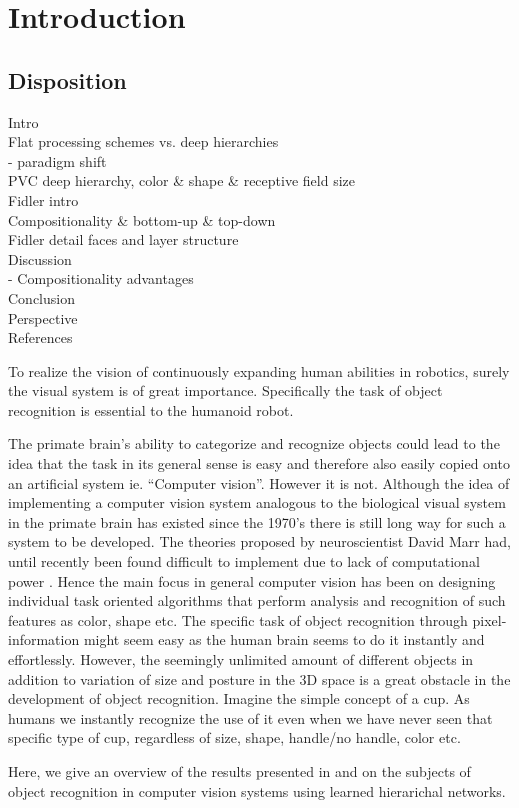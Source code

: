 \section{Introduction}
\label{sec:introduction}

\subsection{Disposition}
Intro \\
Flat processing schemes vs. deep hierarchies\\
-     paradigm shift \\
PVC deep hierarchy, color \& shape \& receptive field size\\
Fidler intro\\
Compositionality \& bottom-up \& top-down\\
Fidler detail faces and layer structure \\
Discussion \\
-    Compositionality advantages \\
Conclusion \\
Perspective \\
References \\


To realize the vision of continuously expanding human abilities in robotics,
surely the visual system is of great importance.
Specifically the task of object recognition is essential to the humanoid robot.

The primate brain's ability to categorize and recognize objects could lead to
the idea that the task in its general sense is easy and therefore also easily
copied onto an artificial system ie. “Computer vision”. However it is not.
Although the idea of implementing a computer vision system analogous to
the biological visual system in the primate brain has existed since the 1970's
there is still long way for such a system to be developed.
The theories proposed by neuroscientist David Marr had,
until recently been found difficult to implement due to lack of computational power \citep{kruger2013deep}.
Hence the main focus in general computer vision has been on designing individual
task oriented algorithms that perform analysis and recognition of such features as color, shape etc.
The specific task of object recognition through pixel-information might seem
easy as the human brain seems to do it instantly and effortlessly.
However, the seemingly unlimited amount of different objects in addition to variation of size
and posture in the 3D space is a great obstacle in the development of object recognition.
Imagine the simple concept of a cup. As humans we instantly recognize the use of it
even when we have never seen that specific type of cup,
regardless of size, shape, handle/no handle, color etc.

Here, we give an overview of the results presented in \citet{kruger2013deep} and \citet{fidler2009learning}
on the subjects of object recognition in computer vision systems using learned hierarichal networks.
